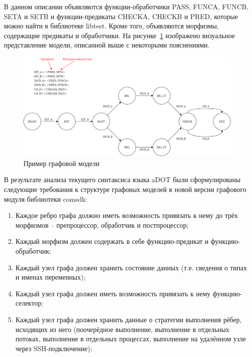 В данном описании объявляются функции-обработчики \textsf{PASS}, \textsf{FUNCA}, \textsf{FUNCB}, \textsf{SETA} и \textsf{SETB} и функции-предикаты \textsf{CHECKA}, \textsf{CHECKB} и \textsf{PRED}, которые можно найти в библиотеке \textsf{libtest}. Кроме того, объявляются морфизмы, содержащие предикаты и обработчики. На рисунке~\ref{fig:aDotExample} изображено визуальное представление модели, описанной выше с некоторыми пояснениями.
\begin{figure}[!ht]
    \centering
    \includegraphics[width=\textwidth]{figures/adot_example.png}
    \caption{Пример графовой модели}
    \label{fig:aDotExample}
\end{figure}

В результате анализа текущего синтаксиса языка aDOT были сформулированы следующие требования к структуре графовых моделей в новой версии графового модуля библиотеки comsdk:
\begin{enumerate}[1)]
    \item Каждое ребро графа должно иметь возможность привязать к нему до трёх морфизмов -- препроцессор, обработчик и постпроцессор;
    \item Каждый морфизм должен содержать в себе функцию-предикат и функцию-обработчик;
    \item Каждый узел графа должен хранить состояние данных (т.е. сведения о типах и именах переменных);
    \item Каждый узел графа должен иметь возможность привязать к нему функцию-селектор;
    \item Каждый узел графа должен хранить данные о стратегии выполнения рёбер, исходящих из него (поочерёдное выполнение, выполнение в отдельных потоках, выполнение в отдельных процессах, выполнение на удалённом узле через SSH-подключение);
\end{enumerate}

